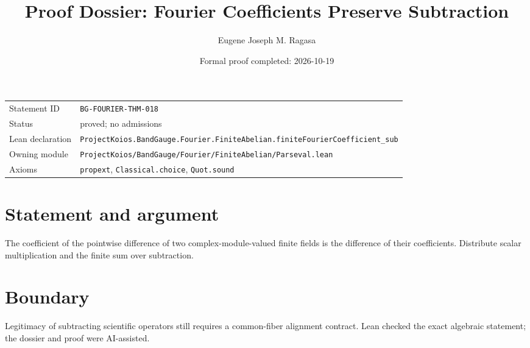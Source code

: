 \documentclass[11pt]{article}
\title{Proof Dossier: Fourier Coefficients Preserve Subtraction}
\author{Eugene Joseph M. Ragasa}
\date{Formal proof completed: 2026-10-19}
\begin{document}
\maketitle
\noindent\begin{tabularx}{\textwidth}{@{}lX@{}}\toprule
Statement ID & \texttt{BG-FOURIER-THM-018} \\
Status & proved; no admissions \\
Lean declaration & \texttt{ProjectKoios.BandGauge.Fourier.FiniteAbelian.}\newline\texttt{finiteFourierCoefficient\_sub} \\
Owning module & \texttt{ProjectKoios/BandGauge/Fourier/FiniteAbelian/Parseval.lean} \\
Axioms & \texttt{propext}, \texttt{Classical.choice}, \texttt{Quot.sound} \\
\bottomrule\end{tabularx}
\section{Statement and argument}
The coefficient of the pointwise difference of two complex-module-valued finite fields is the difference of their coefficients. Distribute scalar multiplication and the finite sum over subtraction.
\section{Boundary}
Legitimacy of subtracting scientific operators still requires a common-fiber alignment contract. Lean checked the exact algebraic statement; the dossier and proof were AI-assisted.
\end{document}
